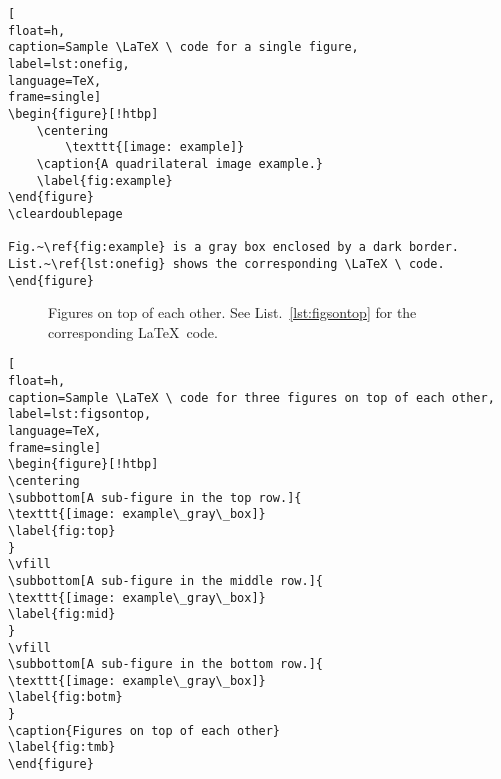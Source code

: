 \begin{lstlisting}[
float=h,
caption=Sample \LaTeX \ code for a single figure, 
label=lst:onefig,
language=TeX,
frame=single]
\begin{figure}[!htbp]
	\centering
		\texttt{[image: example]}
	\caption{A quadrilateral image example.}
	\label{fig:example}
\end{figure}
\cleardoublepage

Fig.~\ref{fig:example} is a gray box enclosed by a dark border. List.~\ref{lst:onefig} shows the corresponding \LaTeX \ code. 	
\end{figure}
\end{lstlisting}
\cleardoublepage





\begin{figure}[!htbp]
\centering
{}
\vfill
{}
\vfill
{}
\caption{Figures on top of each other. See List.~\ref{lst:figsontop} for the corresponding \LaTeX \ code. } 
\label{fig:tmb}
\end{figure}
\cleardoublepage




\begin{lstlisting}[
float=h,
caption=Sample \LaTeX \ code for three figures on top of each other, 
label=lst:figsontop,
language=TeX,
frame=single]
\begin{figure}[!htbp]
\centering
\subbottom[A sub-figure in the top row.]{
\texttt{[image: example\_gray\_box]}
\label{fig:top}
}
\vfill
\subbottom[A sub-figure in the middle row.]{
\texttt{[image: example\_gray\_box]}
\label{fig:mid}
}
\vfill
\subbottom[A sub-figure in the bottom row.]{
\texttt{[image: example\_gray\_box]}
\label{fig:botm}
}
\caption{Figures on top of each other} 
\label{fig:tmb}
\end{figure}
\end{lstlisting}
\cleardoublepage







